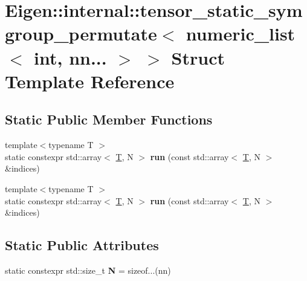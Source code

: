 \hypertarget{struct_eigen_1_1internal_1_1tensor__static__symgroup__permutate_3_01numeric__list_3_01int_00_01nn_8_8_8_01_4_01_4}{}\section{Eigen\+:\+:internal\+:\+:tensor\+\_\+static\+\_\+symgroup\+\_\+permutate$<$ numeric\+\_\+list$<$ int, nn... $>$ $>$ Struct Template Reference}
\label{struct_eigen_1_1internal_1_1tensor__static__symgroup__permutate_3_01numeric__list_3_01int_00_01nn_8_8_8_01_4_01_4}
\subsection*{Static Public Member Functions}
\begin{DoxyCompactItemize}
\item 
\mbox{\label{struct_eigen_1_1internal_1_1tensor__static__symgroup__permutate_3_01numeric__list_3_01int_00_01nn_8_8_8_01_4_01_4_a679389ff3079c6982737da2f55dd95d6}} 
{\footnotesize template$<$typename T $>$ }\\static constexpr std\+::array$<$ \hyperlink{group___sparse_core___module}{T}, N $>$ {\bfseries run} (const std\+::array$<$ \hyperlink{group___sparse_core___module}{T}, N $>$ \&indices)
\item 
\mbox{\label{struct_eigen_1_1internal_1_1tensor__static__symgroup__permutate_3_01numeric__list_3_01int_00_01nn_8_8_8_01_4_01_4_a679389ff3079c6982737da2f55dd95d6}} 
{\footnotesize template$<$typename T $>$ }\\static constexpr std\+::array$<$ \hyperlink{group___sparse_core___module}{T}, N $>$ {\bfseries run} (const std\+::array$<$ \hyperlink{group___sparse_core___module}{T}, N $>$ \&indices)
\end{DoxyCompactItemize}
\subsection*{Static Public Attributes}
\begin{DoxyCompactItemize}
\item 
\mbox{\label{struct_eigen_1_1internal_1_1tensor__static__symgroup__permutate_3_01numeric__list_3_01int_00_01nn_8_8_8_01_4_01_4_af0927b8d96f2072c3e842338686f3861}} 
static constexpr std\+::size\+\_\+t {\bfseries N} = sizeof...(nn)
\end{DoxyCompactItemize}


